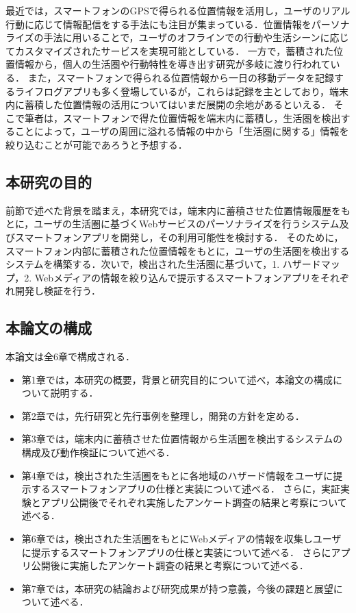 \documentclass[a4paper]{jsarticle}
\begin{document}
最近では，スマートフォンのGPSで得られる位置情報を活用し，ユーザのリアル行動に応じて情報配信をする手法にも注目が集まっている．位置情報をパーソナライズの手法に用いることで，ユーザのオフラインでの行動や生活シーンに応じてカスタマイズされたサービスを実現可能としている\cite{tameco}\cite{bitblend}．
一方で，蓄積された位置情報から，個人の生活圏や行動特性を導き出す研究が多岐に渡り行われている\cite{matsuo}\cite{docomo}．
また，スマートフォンで得られる位置情報から一日の移動データを記録するライフログアプリも多く登場しているが，これらは記録を主としており，端末内に蓄積した位置情報の活用についてはいまだ展開の余地があるといえる．
そこで筆者は，スマートフォンで得た位置情報を端末内に蓄積し，生活圏を検出することによって，ユーザの周囲に溢れる情報の中から「生活圏に関する」情報を絞り込むことが可能であろうと予想する．


\subsection{本研究の目的}
前節で述べた背景を踏まえ，本研究では，端末内に蓄積させた位置情報履歴をもとに，ユーザの生活圏に基づくWebサービスのパーソナライズを行うシステム及びスマートフォンアプリを開発し，その利用可能性を検討する．
そのために，スマートフォン内部に蓄積された位置情報をもとに，ユーザの生活圏を検出するシステムを構築する．次いで，検出された生活圏に基づいて，1. ハザードマップ，2. Webメディアの情報を絞り込んで提示するスマートフォンアプリをそれぞれ開発し検証を行う．

\subsection{本論文の構成}
本論文は全6章で構成される．
\begin{itemize}
  \item
第1章では，本研究の概要，背景と研究目的について述べ，本論文の構成について説明する．
  \item
第2章では，先行研究と先行事例を整理し，開発の方針を定める．
  \item
第3章では，端末内に蓄積させた位置情報から生活圏を検出するシステムの構成及び動作検証について述べる．
  \item
第4章では，検出された生活圏をもとに各地域のハザード情報をユーザに提示するスマートフォンアプリの仕様と実装について述べる．
さらに，実証実験とアプリ公開後でそれぞれ実施したアンケート調査の結果と考察について述べる．
  \item
第6章では，検出された生活圏をもとにWebメディアの情報を収集しユーザに提示するスマートフォンアプリの仕様と実装について述べる．
さらにアプリ公開後に実施したアンケート調査の結果と考察について述べる．
  \item
第7章では，本研究の結論および研究成果が持つ意義，今後の課題と展望について述べる．
\end{itemize}
\end{document}

